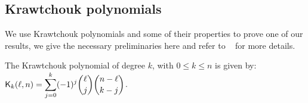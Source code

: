 \documentclass[11pt]{llncs}
\begin{document}








\subsection{Krawtchouk polynomials}
We use Krawtchouk polynomials and some of their properties to prove one of our results, we give the necessary preliminaries here and refer to \eg ~\cite{book:MacSlo78} for more details.

\begin{definition}\label{def:Kraw}
	The Krawtchouk polynomial of degree $k$, with $0\leq k\leq n$ is given by: $ \displaystyle \mathsf{K}_{k}(\ell,n)=\sum_{j=0}^{k} (-1)^j \binom{\ell}{j} \binom{n-\ell}{k-j}$. 
\end{definition}
\end{document}
